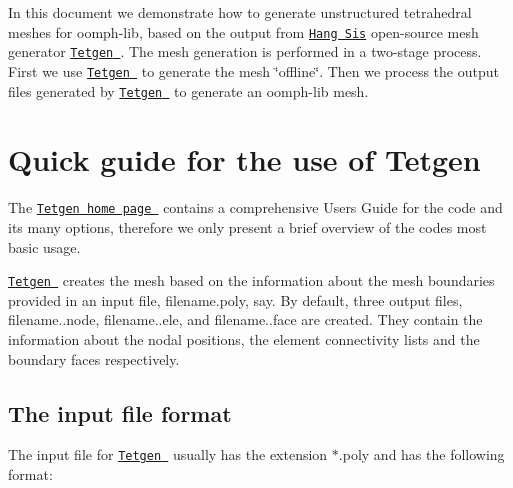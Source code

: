 In this document we demonstrate how to generate unstructured tetrahedral meshes for {\ttfamily oomph-\/lib}, based on the output from \href{http://www.wias-berlin.de/~si }{\tt Hang Si\textquotesingle{}s} open-\/source mesh generator \href{http://wias-berlin.de/software/tetgen//}{\tt {\ttfamily Tetgen} }. The mesh generation is performed in a two-\/stage process. First we use \href{http://wias-berlin.de/software/tetgen//}{\tt {\ttfamily Tetgen} } to generate the mesh \char`\"{}offline\char`\"{}. Then we process the output files generated by \href{http://wias-berlin.de/software/tetgen//}{\tt {\ttfamily Tetgen} } to generate an {\ttfamily oomph-\/lib} mesh.



 

\hypertarget{index_Tetgen_use}{}\section{Quick guide for the use of Tetgen}\label{index_Tetgen_use}
The \href{http://wias-berlin.de/software/tetgen//}{\tt {\ttfamily Tetgen} home page } contains a comprehensive User\textquotesingle{}s Guide for the code and its many options, therefore we only present a brief overview of the code\textquotesingle{}s most basic usage.

\href{http://wias-berlin.de/software/tetgen//}{\tt {\ttfamily Tetgen} } creates the mesh based on the information about the mesh boundaries provided in an input file, {\ttfamily filename.\+poly}, say. By default, three output files, {\ttfamily filename..\+node}, {\ttfamily filename..\+ele}, and {\ttfamily filename..\+face} are created. They contain the information about the nodal positions, the element connectivity lists and the boundary faces respectively.



\hypertarget{index_input}{}\subsection{The input file format}\label{index_input}
The input file for \href{http://wias-berlin.de/software/tetgen//}{\tt {\ttfamily Tetgen} } usually has the extension {\ttfamily $\ast$}.{\ttfamily poly} and has the following format\+:

